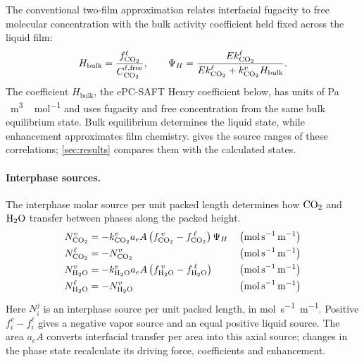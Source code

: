 The conventional two-film approximation relates interfacial fugacity to free molecular concentration with the bulk activity coefficient held fixed across the liquid film:
\begin{equation}
H_{\mathrm{bulk}}=\frac{f^{\ell}_{\COtwo}}{C^{\ell,\mathrm{free}}_{\COtwo}},
\qquad \Psi_H=\frac{E k^{\ell}_{\COtwo}}{E k^{\ell}_{\COtwo}+k^{v}_{\COtwo}H_{\mathrm{bulk}}}.
\end{equation}
The coefficient $H_{\mathrm{bulk}}$, the ePC-SAFT Henry coefficient below, has units of \unit{Pa\,m^3\,mol^{-1}} and uses fugacity and free \COtwo{} concentration from the same bulk equilibrium state.
Bulk equilibrium determines the liquid state, while enhancement approximates film chemistry.
 gives the source ranges of these correlations; \cref{sec:results} compares them with the calculated states.

\paragraph{Interphase sources.}
The interphase molar source per unit packed length determines how $\COtwo$ and $\HtwoO$ transfer between phases along the packed height.
\begin{align}
\molarflux^{\vap}_{ \COtwo} &=  -k^{\vap}_{ \COtwo}  a_e A  \left(f^{\:\vap}_{ \COtwo} - f^{\:\liq}_{ \COtwo}\right) \Psi _{H} && \left(\unit{mol\,s^{-1}\,m^{-1}}\right) \\
\molarflux^{\liq}_{ \COtwo} &= -\molarflux^{\vap}_{ \COtwo} && \left(\unit{mol\,s^{-1}\,m^{-1}}\right) \\
\molarflux^{\vap}_{ \HtwoO} &= -k^{\vap}_{ \HtwoO} a_e A \left(f^{\:\vap}_{ \HtwoO} - f^{\:\liq}_{ \HtwoO}\right)  && \left(\unit{mol\,s^{-1}\,m^{-1}}\right) \\
\molarflux^{\liq}_{ \HtwoO} &= -\molarflux^{\vap}_{ \HtwoO} && \left(\unit{mol\,s^{-1}\,m^{-1}}\right)
\end{align}
Here $N_i^j$ is an interphase source per unit packed length, in \unit{mol.s^{-1}.m^{-1}}.
Positive $f_i^v-f_i^\ell$ gives a negative vapor source and an equal positive liquid source.
The area $a_eA$ converts interfacial transfer per area into this axial source; changes in the phase state recalculate its driving force, coefficients and enhancement.


